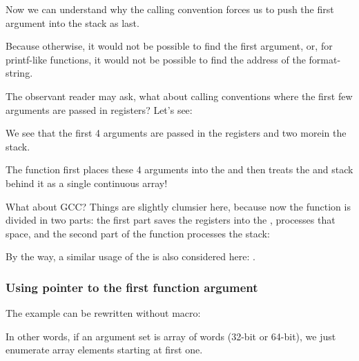 Now we can understand why the  calling convention forces us to push the first argument 
into the stack as last.

Because otherwise, it would not be possible to find the first argument, 
or, for printf-like functions, it would not be possible to find the address of the format-string.

\label{variadic_arith_registers}

The observant reader may ask, what about calling conventions where the first few arguments are passed in registers?
Let's see:



We see that the first 4 arguments are passed in the registers and two more\EMDASH{}in the stack.

The  function first places these 4 arguments into the  and then treats
the  and stack behind it as a single continuous array!

What about GCC? Things are slightly clumsier here, because now the function is divided in two parts:
the first part saves the registers into the , processes that space, and the second part of the function processes 
the stack:



By the way, a similar usage of the  is also considered here: .

\subsubsection{Using pointer to the first function argument}

The example can be rewritten without  macro:



In other words, if an argument set is array of words (32-bit or 64-bit), we just enumerate array elements starting
at first one.


